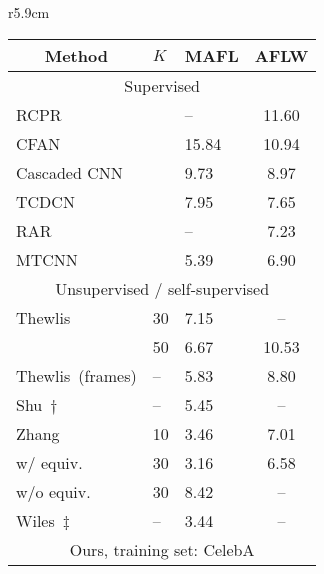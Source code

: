 \documentclass{article}
\begin{document}
\begin{wraptable}{r}{5.9cm}
\footnotesize
\setlength{\tabcolsep}{4pt}
\centering
\begin{tabular}{@{}lllc@{}}
\toprule
\multicolumn{1}{c}{Method}                    & $K$  & MAFL       & \multicolumn{1}{l}{AFLW} \\ \midrule
\multicolumn{4}{c}{Supervised}                                           \\
RCPR~\citep{burgos2013robust}                 &      & {--}       & 11.60                    \\
CFAN~\citep{zhang2014coarse}                  &      & 15.84      & 10.94                    \\
Cascaded CNN~\citep{sun2013deep}              &      & 9.73       & 8.97                     \\
TCDCN~\citep{Zhang2016}                       &      & 7.95       & 7.65                     \\
RAR~\citep{sun2013deep}                       &      & {--}       & 7.23                     \\
MTCNN~\citep{zhang2014facial}                 &      & 5.39       & 6.90                     \\ \midrule
\multicolumn{4}{c}{Unsupervised / self-supervised}                                           \\
Thewlis~\cite{thewlis17unsupervised}          & 30   & 7.15       & {--}                    \\
                                              & 50   & 6.67       & 10.53                    \\
Thewlis~\cite{thewlis17Bunsupervised}(frames) & {--} & 5.83       & 8.80                     \\
Shu~$\dagger$~\cite{shu2018deforming}         & {--} & 5.45       & {--}                     \\
Zhang~\cite{zhang2018unsupervised}            & 10   & 3.46       & 7.01                     \\
\quad w/ equiv.                               & 30   & 3.16       & 6.58                     \\
\quad w/o equiv.                              & 30   & 8.42       & {--}                     \\
Wiles~$\ddagger$~\cite{Wiles18a}              & {--} & 3.44       & {--}                     \\ \midrule
\multicolumn{4}{c}{Ours, training set: CelebA}                                               \\

\end{tabular}
\end{wraptable}
\end{document}
